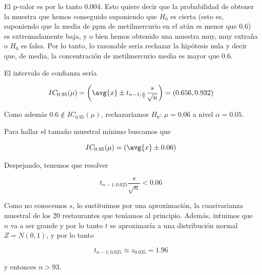 \begin{problem}[1]
El p-valor es por lo tanto $0.004$. Esto quiere decir que la probabilidad de obtener la muestra que hemos conseguido suponiendo que $H_0$ es cierta (esto es, suponiendo que la media de ppm de metilmercurio en el atún es menor que $0.6$) es extremadamente baja, y o bien hemos obtenido una muestra muy, muy extraña o $H_0$ es falsa. Por lo tanto, lo razonable sería rechazar la hipótesis nula y decir que, de media, la concentración de metilmercurio media es mayor que $0.6$.

\spart El intervalo de confianza sería 

\[ IC_{0.95} (\mu) = \left(\avg{x}\pm t_{n-1;\frac{\alpha}{2}}\frac{s}{\sqrt{n}} \right) = (0.656, 0.932) \]

Como además $0.6\notin IC_{0.95}(\mu)$, rechazaríamos $H_0:\,\mu=0.06$ a nivel $\alpha=0.05$.

Para hallar el tamaño muestral mínimo buscamos que 

\[ IC_{0.95}(\mu) = (\avg{x} \pm 0.06)\]

Despejando, tenemos que resolver

\[ t_{n-1;0.025}\frac{s}{\sqrt{n}} < 0.06\]

Como no conocemos $s$, lo sustituimos por una aproximación, la cuasivarianza muestral de los 20 restaurantes que teníamos al principio. Además, intuimos que $n$ va a ser grande y por lo tanto $t$ se aproximaría a una distribución normal $Z = N(0,1)$, y por lo tanto

\[ t_{n-1;0.025} \approx z_{0.025} = 1.96 \]

y entonces $n > 93$.
\end{problem}

\newpage

